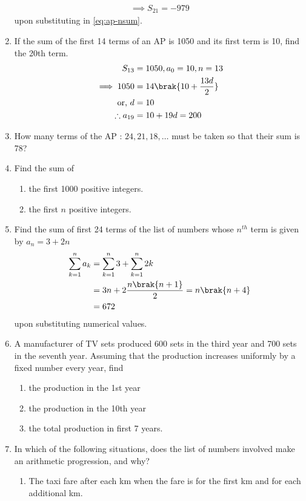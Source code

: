 \begin{enumerate}[label=\thesubsection.\arabic*, ref=\thesubsection.\theenumi]
\begin{align}
\implies 
	S_{21} = -979
\end{align}
upon substituting in 
	\eqref{eq:ap-nsum}.
\item If the sum of the first 14 terms of an AP is 1050 and its first term is 10,  find the 20th term.
	\\
	\solution
	\begin{align}
		S_{13} &= 1050, a_0 = 10, n = 13
		\\
		\implies 1050 &= 14\brak{10+\frac{13d}{2}}
		\\
		\text{or, } d&= 10
		\\
		\therefore
		a_{19} &= 10+19d = 200
	\end{align}
\item How many terms of the AP : $24,  21,  18,  \dots$ must be taken so that their
sum is 78?
\item Find the sum of 
\begin{enumerate}
\item the first 1000 positive integers.
\item the first $n$ positive integers.
\end{enumerate}
\item Find the sum of first 24 terms of the list of numbers whose $n^{th}$ term is given by $a_n = 3 + 2n$
	\\
	\solution
\begin{align}
	\sum_{k=1}^{n}a_k &= \sum_{k=1}^{n}3 + \sum_{k=1}^{n}2k
	\\
	&=3n + 2\frac{n\brak{n+1}}{2} = n\brak{n+4}
	\\
	&= 672
\end{align}
upon substituting numerical values.
\item A manufacturer of TV sets produced 600 sets in the third year and 700
sets in the seventh year. Assuming that the production increases uniformly by a fixed number every year,  find 
\begin{enumerate}
\item   the production in the 1st year
\item	the production in the 10th year
\item the total production in first 7 years.
\end{enumerate}
\item In which of the following situations,  does the list of numbers involved make an arithmetic progression,  and why?
\begin{enumerate}
\item The taxi fare after each km when the fare is  for the first km and  for each additional km.

\end{enumerate}
\end{enumerate}
